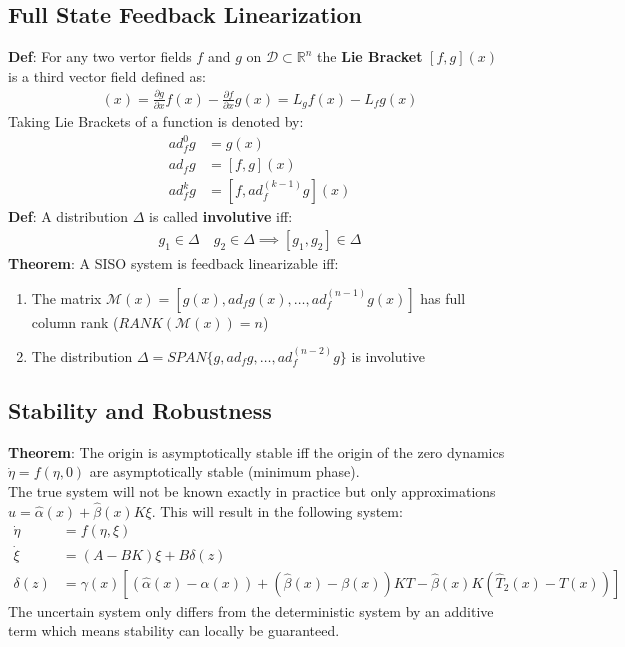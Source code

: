 \subsection{Full State Feedback Linearization}
\textbf{Def}: For any two vertor fields $f$ and $g$ on $\mathcal{D} \subset \mathbb{R}^n$ the \textbf{Lie Bracket} $[f,g](x)$ is a third vector field defined as:
\begin{align*}
    [f,g](x) = \frac{\partial g}{\partial x}f(x) - \frac{\partial f}{\partial x}g(x) = L_g f(x) - L_f g(x)
\end{align*}
Taking Lie Brackets of a function is denoted by:
\begin{align*}
    ad_f^0g & = g(x)                 \\
    ad_fg   & = [f,g](x)             \\
    ad_f^kg & = [f,ad_f^{(k-1)}g](x)
\end{align*}
\textbf{Def}: A distribution $\Delta$ is called \textbf{involutive} iff:
\begin{align*}
    g_1\in \Delta \quad g_2\in \Delta \implies [g_1,g_2] \in \Delta
\end{align*}
\textbf{Theorem}: A SISO system is feedback linearizable iff:
\begin{enumerate}
    \item The matrix $\mathcal{M}(x) = [g(x), ad_fg(x), \dots , ad_f^{(n-1)}g(x)]$ has full column rank ($RANK(\mathcal{M}(x)) = n$)
    \item The distribution $\Delta = SPAN\{g, ad_fg, \dots, ad_f^{(n-2)}g \}$ is involutive
\end{enumerate}
\subsection{Stability and Robustness}
\textbf{Theorem}: The origin is asymptotically stable iff the origin of the zero dynamics $\Dot{\eta} = f(\eta,0)$ are asymptotically stable (minimum phase).\\
The true system will not be known exactly in practice but only approximations $u = \hat{\alpha}(x) + \hat{\beta}(x)K\xi$. This will result in the following system:
\begin{align*}
    \Dot{\eta} & = f(\eta,\xi)                                                                                                      \\
    \Dot{\xi}  & = (A-BK)\xi + B \delta(z)                                                                                          \\
    \delta(z)  & = \gamma(x) [(\hat{\alpha}(x)-\alpha(x)) + (\hat{\beta}(x) - \beta(x) ) KT - \hat{\beta}(x)K(\hat{T}_2(x) - T(x))]
\end{align*}
The uncertain system only differs from the deterministic system by an additive term which means stability can locally be guaranteed.

